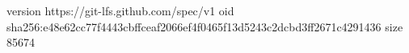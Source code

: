 version https://git-lfs.github.com/spec/v1
oid sha256:e48e62cc77f4443cbffceaf2066ef4f0465f13d5243c2dcbd3ff2671c4291436
size 85674
